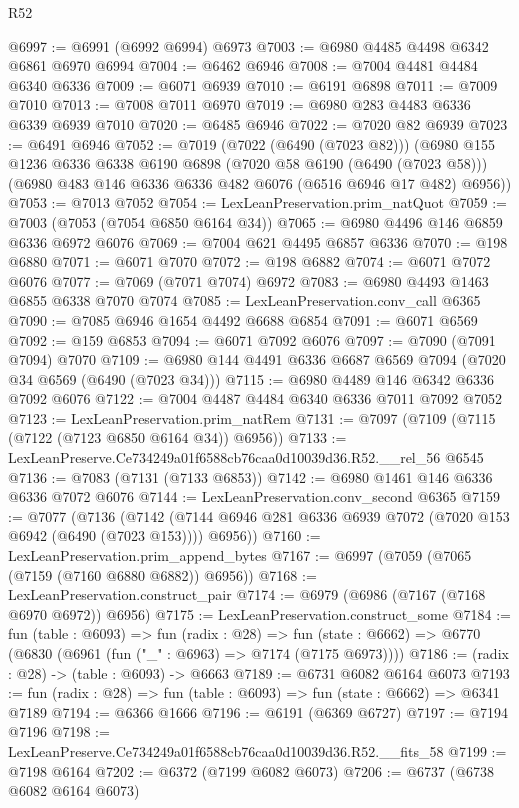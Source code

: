 \begin{lexlean}{R52}
\begin{coremodule}
@6997 := @6991 (@6992 @6994) @6973
@7003 := @6980 @4485 @4498 @6342 @6861 @6970 @6994
@7004 := @6462 @6946
@7008 := @7004 @4481 @4484 @6340 @6336
@7009 := @6071 @6939
@7010 := @6191 @6898
@7011 := @7009 @7010
@7013 := @7008 @7011 @6970
@7019 := @6980 @283 @4483 @6336 @6339 @6939 @7010
@7020 := @6485 @6946
@7022 := @7020 @82 @6939
@7023 := @6491 @6946
@7052 := @7019
    (@7022 (@6490 (@7023 @82)))
    (@6980
      @155
      @1236
      @6336
      @6338
      @6190
      @6898
      (@7020 @58 @6190 (@6490 (@7023 @58)))
      (@6980 @483 @146 @6336 @6336 @482 @6076 (@6516 @6946 @17 @482) @6956))
@7053 := @7013 @7052
@7054 := LexLeanPreservation.prim_natQuot
@7059 := @7003 (@7053 (@7054 @6850 @6164 @34))
@7065 := @6980 @4496 @146 @6859 @6336 @6972 @6076
@7069 := @7004 @621 @4495 @6857 @6336
@7070 := @198 @6880
@7071 := @6071 @7070
@7072 := @198 @6882
@7074 := @6071 @7072 @6076
@7077 := @7069 (@7071 @7074) @6972
@7083 := @6980 @4493 @1463 @6855 @6338 @7070 @7074
@7085 := LexLeanPreservation.conv_call @6365
@7090 := @7085 @6946 @1654 @4492 @6688 @6854
@7091 := @6071 @6569
@7092 := @159 @6853
@7094 := @6071 @7092 @6076
@7097 := @7090 (@7091 @7094) @7070
@7109 := @6980 @144 @4491 @6336 @6687 @6569 @7094 (@7020 @34 @6569 (@6490 (@7023 @34)))
@7115 := @6980 @4489 @146 @6342 @6336 @7092 @6076
@7122 := @7004 @4487 @4484 @6340 @6336 @7011 @7092 @7052
@7123 := LexLeanPreservation.prim_natRem
@7131 := @7097 (@7109 (@7115 (@7122 (@7123 @6850 @6164 @34)) @6956))
@7133 := LexLeanPreserve.Ce734249a01f6588cb76caa0d10039d36.R52.__rel_56 @6545
@7136 := @7083 (@7131 (@7133 @6853))
@7142 := @6980 @1461 @146 @6336 @6336 @7072 @6076
@7144 := LexLeanPreservation.conv_second @6365
@7159 := @7077
    (@7136
      (@7142 (@7144 @6946 @281 @6336 @6939 @7072 (@7020 @153 @6942 (@6490 (@7023 @153)))) @6956))
@7160 := LexLeanPreservation.prim_append_bytes
@7167 := @6997 (@7059 (@7065 (@7159 (@7160 @6880 @6882)) @6956))
@7168 := LexLeanPreservation.construct_pair
@7174 := @6979 (@6986 (@7167 (@7168 @6970 @6972)) @6956)
@7175 := LexLeanPreservation.construct_some
@7184 := fun (table : @6093) =>
  fun (radix : @28) =>
  fun (state : @6662) => @6770 (@6830 (@6961 (fun ("_" : @6963) => @7174 (@7175 @6973))))
@7186 := (radix : @28) -> (table : @6093) -> @6663
@7189 := @6731 @6082 @6164 @6073
@7193 := fun (radix : @28) => fun (table : @6093) => fun (state : @6662) => @6341 @7189
@7194 := @6366 @1666
@7196 := @6191 (@6369 @6727)
@7197 := @7194 @7196
@7198 := LexLeanPreserve.Ce734249a01f6588cb76caa0d10039d36.R52.__fits_58
@7199 := @7198 @6164
@7202 := @6372 (@7199 @6082 @6073)
@7206 := @6737 (@6738 @6082 @6164 @6073)

\end{coremodule}
\end{lexlean}
